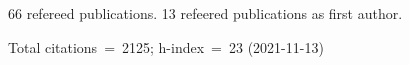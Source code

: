 66 refereed publications. 13 refeered publications as first author.

Total citations~=~2125; h-index~=~23 (2021-11-13)